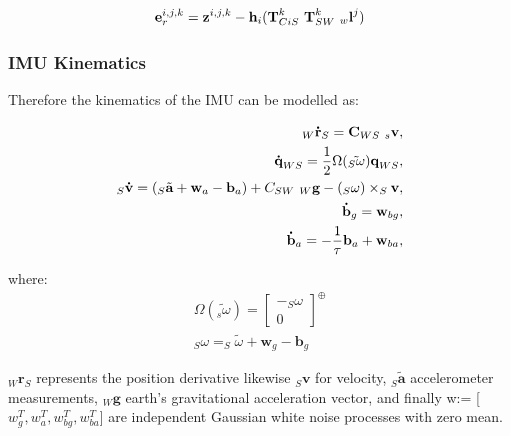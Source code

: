 \documentclass[a4paper,11pt,notitlepage]{article}
\begin{document}
\begin{equation}
\begin{aligned}
\textbf{e}_{r}^{i,j,k} = \textbf{z}^{i,j,k} - \textbf{h}_{i} (\textbf{T}^{k}_{CiS} \textnormal{ } \textbf{T}^{k}_{SW} \textnormal{ } _{w}\textbf{l}^{j})
\end{aligned}
\end{equation}




\subsubsection{IMU Kinematics}

Therefore the kinematics of the IMU can be modelled as:

\begin{equation}
\begin{aligned}
\label{imu_kin}
_{W} \textbf{\.{r}}_{S} = \textbf{C}_{WS} \textnormal{ } _{s}\textbf{v}, \\
\textbf{\.{q}}_{WS} = \frac{1}{2} \Omega(\tilde{_{S}\textbf{$\omega$}})\textbf{q}_{WS}, \\
_{S}\textbf{\.{v}}= (_{S}\tilde{\textbf{a}} + \textbf{w}_{a} - \textbf{b}_{a}) + C_{SW} \textnormal{ } _{W}\textbf{g} - (_{S}\textbf{$\omega$}) \times _{S}\textbf{v}, \\
\textbf{\.{b}}_{g} = \textbf{w}_{bg}, \\
\textbf{\.{b}}_{a} = -\frac{1}{\tau}\textbf{b}_{a} + \textbf{w}_{ba}, \\
\end{aligned}
\end{equation}

where:
\begin{equation}
\begin{aligned}
 \Omega(\tilde{_{s}\textbf{$\omega$}}) = \begin{bmatrix}
       -_{S}\textbf{$\omega$}  \\[0.3em]
       0
     \end{bmatrix} ^{\oplus} \\
_{S}\textbf{$\omega$} =  _{S}\tilde{\textbf{$\omega$}} + \textbf{w}_{g} - \textbf{b}_{g}
\end{aligned}
\end{equation}

 $_{W} \textbf{\.{r}}_{S}$ represents the position derivative likewise $_{S}\textbf{\.{v}}$ for velocity,  $_{S}\tilde{\textbf{a}}$ accelerometer measurements, $_{W}\textbf{g}$ earth's gravitational acceleration vector, and finally w:= [$w_{g}^{T},w_{a}^{T},w_{bg}^{T},w_{ba}^{T}$] are independent Gaussian white noise processes with zero mean.
 
\end{document}

